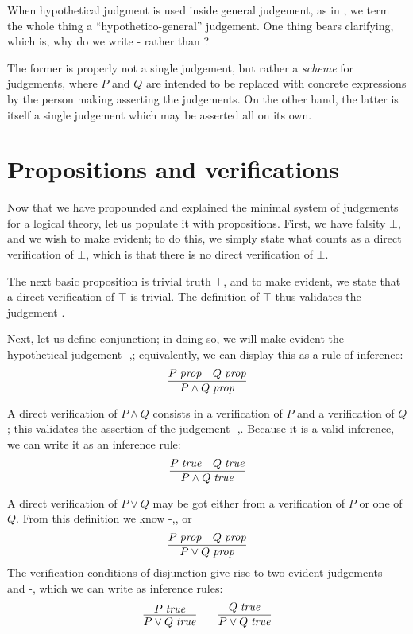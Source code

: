 \documentclass[main.tex]{subfiles}
\begin{document}
When hypothetical judgment is used inside general judgement, as in
, we term the whole thing a
``hypothetico-general'' judgement. One thing bears clarifying, which is, why do
we write \hyp{}{} rather than
?

The former is properly not a single judgement, but rather a \emph{scheme} for
judgements, where $P$ and $Q$ are intended to be replaced with concrete
expressions by the person making asserting the judgements. On the other hand, the
latter is itself a single judgement which may be asserted all on its own.

\section{Propositions and verifications}
Now that we have propounded and explained the minimal system of judgements for
a logical theory, let us populate it with propositions. First, we have falsity
$\bot$, and we wish to make \isprop{\bot} evident; to do this, we simply state
what counts as a direct verification of $\bot$, which is that there is no
direct verification of $\bot$.

The next basic proposition is trivial truth $\top$, and to make \isprop{\top}
evident, we state that a direct verification of $\top$ is trivial. The definition
of $\top$ thus validates the judgement \istrue{\top}.

Next, let us define conjunction; in doing so, we will make evident the
hypothetical judgement \hyp{}{,};
equivalently, we can display this as a rule of inference:
\[
  \infer{
    \isprop{P\land Q}
  }{
    \isprop{P} &
    \isprop{Q}
  }
\]

A direct verification of $P\land Q$ consists in a verification of $P$
and a verification of $Q$; this validates the assertion of the judgement
\hyp{}{,}. Because it is a valid
inference, we can write it as an inference rule:
\[
  \infer{
    \istrue{P\land Q}
  }{
    \istrue{P} &
    \istrue{Q}
  }
\]

A direct verification of $P\lor Q$ may be got either from a verification
of $P$ or one of $Q$. From this definition we know \hyp{}{,}, or
\[
  \infer{
    \isprop{P\lor Q}
  }{
    \isprop{P} &
    \isprop{Q}
  }
\]
The verification conditions of disjunction give
rise to two evident judgements \hyp{}{} and
\hyp{}{}, which we can write as inference rules:
\begin{gather*}
  \infer{
    \istrue{P\lor Q}
  }{
    \istrue{P}
  }
  \qquad
  \infer{
    \istrue{P\lor Q}
  }{
    \istrue{Q}
  }
\end{gather*}
\end{document}
